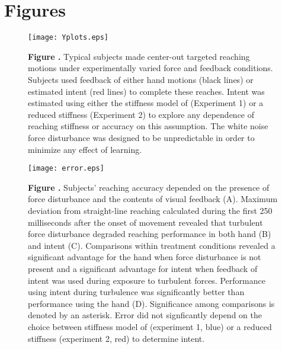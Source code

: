 \documentclass{frontiersSCNS} %
\begin{document}
\section*{Figures}


\begin{figure}[h!]
\begin{center}
\texttt{[image: Yplots.eps]}
\end{center}
\textbf{\label{fig:01} Figure .}{ Typical subjects made center-out targeted reaching motions under experimentally varied force and feedback conditions. Subjects used feedback of either hand motions (black lines) or estimated intent (red lines) to complete these reaches. Intent was estimated using either the stiffness model of \cite{shadmehr1994adaptive} (Experiment 1) or a reduced stiffness (Experiment 2) to explore any dependence of reaching stiffness or accuracy on this assumption. The white noise force disturbance was designed to be unpredictable in order to minimize any effect of learning. }
\end{figure}

\begin{figure}[h!]
\begin{center}
\texttt{[image: error.eps]}
\end{center}
\textbf{\label{fig:02} Figure .}{ Subjects' reaching accuracy depended on the presence of force disturbance and the contents of visual feedback (A). Maximum deviation from straight-line reaching calculated during the first 250 milliseconds after the onset of movement revealed that turbulent force disturbance degraded reaching performance in both hand (B) and intent (C). Comparisons within treatment conditions revealed a significant advantage for the hand when force disturbance is not present and a significant advantage for intent when feedback of intent was used during exposure to turbulent forces. Performance using intent during turbulence was significantly better than performance using the hand (D). Significance among comparisons is denoted by an asterisk. Error did not signficantly depend on the choice between stiffness model of \cite{shadmehr1994adaptive} (experiment 1, blue) or a reduced stiffness (experiment 2, red) to determine intent.}
\end{figure}
\end{document}
